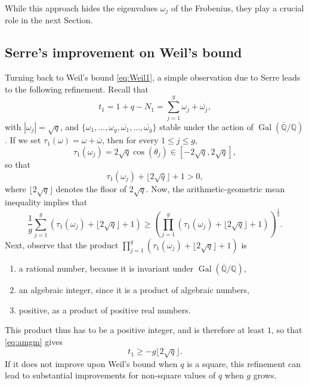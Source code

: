\documentclass{amsart}
\newcommand{\Q}{\mathbb{Q}}
\DeclareMathOperator{\Gal}{Gal}
\begin{document}
While this approach hides the eigenvalues $\omega_j$ of the Frobenius, they play a crucial role in the next Section. 



\subsection{Serre's improvement on Weil's bound}\label{sec:SerreWeil}

Turning back to Weil's bound \eqref{eq:Weil1}, a simple observation due to Serre leads to the following refinement. 
Recall that 
\[
t_1 = 1+q -N_1 = \sum_{j=1}^g \omega_j + \overline{\omega_j},
\]
with $\left| \omega_j \right| = \sqrt{q}$, and $\{ \omega_1, \ldots, \omega_g, \overline{\omega_1}, \ldots, \overline{\omega_g} \}$ stable under the action of $\Gal(\overline{\Q}/\Q)$.
If we set $\tau_1(\omega) = \omega + \overline{\omega}$, then for every $1 \leq j \leq g$, 
\[
\tau_1(\omega_j) = 2\sqrt{q}\cos(\theta_j) \in [-2\sqrt{q}, 2\sqrt{q}],
\]
so that 
\[
\tau_1(\omega_j) + \lfloor 2\sqrt{q} \rfloor + 1 >0,
\]
where $\lfloor 2\sqrt{q} \rfloor$ denotes the floor of $2\sqrt{q}$.  
Now, the arithmetic-geometric mean inequality implies that
\begin{equation}\label{eq:amgm}
\frac{1}{g}\sum_{j=1}^g (\tau_1(\omega_j) + \lfloor 2\sqrt{q} \rfloor + 1) \geq \left( \prod_{j=1}^g (\tau_1(\omega_j) + \lfloor 2\sqrt{q} \rfloor + 1) \right)^{\frac{1}{g}}.
\end{equation}
Next, observe that the product $\prod_{j=1}^g (\tau_1(\omega_j) + \lfloor 2\sqrt{q} \rfloor + 1)$ is 
\begin{enumerate}[label = \roman*)]
\item a rational number, because it is invariant under $\Gal(\overline{\Q}/\Q)$,
\item an algebraic integer, since it is a product of algebraic numbers,
\item positive, as a product of positive real numbers.
\end{enumerate}
This product thus has to be a positive integer, and is therefore at least $1$, so that \eqref{eq:amgm} gives
\begin{equation}\label{eq:SerreWeil}
t_1 \geq -g\lfloor 2\sqrt{q} \rfloor.
\end{equation}
If it does not improve upon Weil's bound when $q$ is a square, this refinement can lead to substantial improvements for non-square values of $q$ when $g$ grows.  
%
\end{document}
